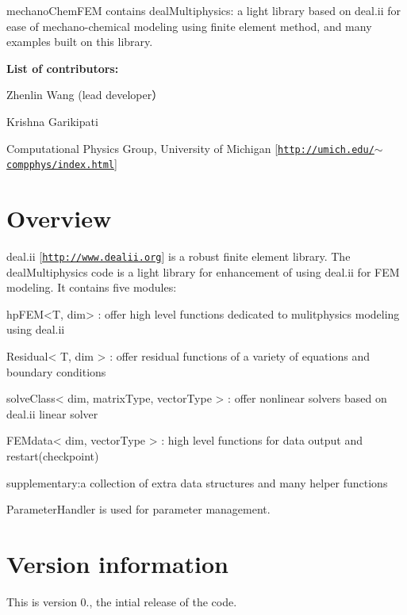 mechano\+Chem\+F\+EM contains deal\+Multiphysics\+: a light library based on deal.\+ii for ease of mechano-\/chemical modeling using finite element method, and many examples built on this library.

{\bfseries List of contributors\+:}~\newline


Zhenlin Wang (lead developer）~\newline


Krishna Garikipati~\newline


Computational Physics Group, University of Michigan \mbox{[}\href{http://umich.edu/~compphys/index.html}{\tt http\+://umich.\+edu/$\sim$compphys/index.\+html}\mbox{]}

\section*{{\bfseries Overview}~\newline
 }

deal.\+ii \mbox{[}\href{http://www.dealii.org}{\tt http\+://www.\+dealii.\+org}\mbox{]} is a robust finite element library. The deal\+Multiphysics code is a light library for enhancement of using deal.\+ii for F\+EM modeling. It contains five modules\+:


\begin{DoxyCode}
hpFEM<T, dim> : offer high level functions dedicated to mulitphysics modeling \textcolor{keyword}{using} deal.ii

Residual< T, dim > : offer residual functions of a variety of equations and boundary conditions

solveClass< dim, matrixType, vectorType > : offer nonlinear solvers based on deal.ii linear solver

FEMdata< dim, vectorType > : high level functions \textcolor{keywordflow}{for} data output and restart(checkpoint)

supplementary:a collection of extra data structures and many helper functions
\end{DoxyCode}


Parameter\+Handler is used for parameter management.

\section*{{\bfseries Version information}~\newline
 }

This is version 0., the intial release of the code.

